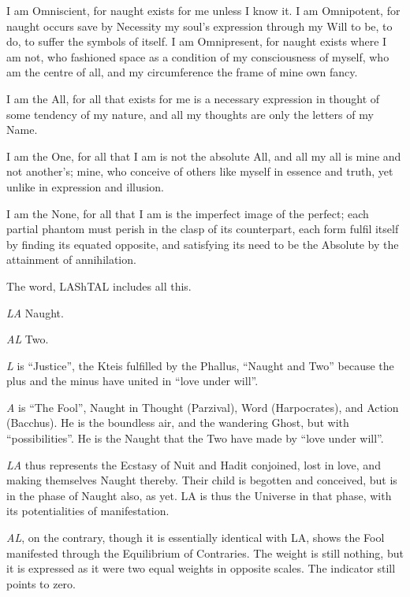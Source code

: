 I am Omniscient, for naught exists for me unless I know it. I am Omnipotent, for naught occurs save by Necessity my soul's expression through my Will to be, to do, to suffer the symbols of itself. I am Omnipresent, for naught exists where I am not, who fashioned space as a condition of my consciousness of myself, who am the centre of all, and my circumference the frame of mine own fancy.

I am the All, for all that exists for me is a necessary expression in thought of some tendency of my nature, and all my thoughts are only the letters of my Name.

I am the One, for all that I am is not the absolute All, and all my all is mine and not another's; mine, who conceive of others like myself in essence and truth, yet unlike in expression and illusion.

I am the None, for all that I am is the imperfect image of the perfect; each partial phantom must perish in the clasp of its counterpart, each form fulfil itself by finding its equated opposite, and satisfying its need to be the Absolute by the attainment of annihilation.

The word, LAShTAL includes all this.

\textit{LA} \textemdash{} Naught.

\textit{AL} \textemdash{} Two.

\textit{L} is \enquote{Justice}, the Kteis fulfilled by the Phallus, \enquote{Naught and Two} because the plus and the minus have united in \enquote{love under will}.

\textit{A} is \enquote{The Fool}, Naught in Thought (Parzival), Word (Harpocrates), and Action (Bacchus). He is the boundless air, and the wandering Ghost, but with \enquote{possibilities}. He is the Naught that the Two have made by \enquote{love under will}.

\textit{LA} thus represents the Ecstasy of Nuit and Hadit conjoined, lost in love, and making themselves Naught thereby. Their child is begotten and conceived, but is in the phase of Naught also, as yet. LA is thus the Universe in that phase, with its potentialities of manifestation.

\textit{AL}, on the contrary, though it is essentially identical with LA, shows the Fool manifested through the Equilibrium of Contraries. The weight is still nothing, but it is expressed as it were two equal weights in opposite scales. The indicator still points to zero.

